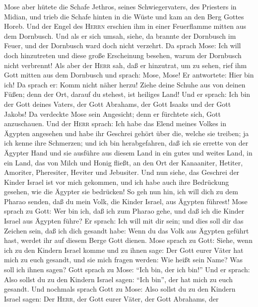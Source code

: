  Mose aber hütete die Schafe Jethros, seines
Schwiegervaters, des Priesters in Midian, und trieb die Schafe hinten in
die Wüste und kam an den Berg Gottes Horeb.  Und der Engel
des \textsc{Herrn} erschien ihm in einer Feuerflamme mitten aus dem
Dornbusch. Und als er sich umsah, siehe, da brannte der Dornbusch im
Feuer, und der Dornbusch ward doch nicht verzehrt.  Da
sprach Mose: Ich will doch hinzutreten und diese große Erscheinung
besehen, warum der Dornbusch nicht verbrennt!  Als aber
der \textsc{Herr} sah, daß er hinzutrat, um zu sehen, rief ihm Gott
mitten aus dem Dornbusch und sprach: Mose, Mose! Er antwortete: Hier bin
ich!  Da sprach er: Komm nicht näher herzu! Ziehe deine
Schuhe aus von deinen Füßen; denn der Ort, darauf du stehest, ist
heiliges Land!  Und er sprach: Ich bin der Gott deines
Vaters, der Gott Abrahams, der Gott Isaaks und der Gott Jakobs! Da
verdeckte Mose sein Angesicht; denn er fürchtete sich, Gott anzuschauen.
 Und der \textsc{Herr} sprach: Ich habe das Elend meines
Volkes in Ägypten angesehen und habe ihr Geschrei gehört über die,
welche sie treiben; ja ich kenne ihre Schmerzen;  und ich
bin herabgefahren, daß ich sie errette von der Ägypter Hand und sie
ausführe aus diesem Land in ein gutes und weites Land, in ein Land, das
von Milch und Honig fließt, an den Ort der Kanaaniter, Hetiter,
Amoriter, Pheresiter, Heviter und Jebusiter.  Und nun
siehe, das Geschrei der Kinder Israel ist vor mich gekommen, und ich
habe auch ihre Bedrückung gesehen, wie die Ägypter sie bedrücken!
 So geh nun hin, ich will dich zu dem Pharao senden, daß
du mein Volk, die Kinder Israel, aus Ägypten führest! 
Mose sprach zu Gott: Wer bin ich, daß ich zum Pharao gehe, und daß ich
die Kinder Israel aus Ägypten führe?  Er sprach: Ich will
mit dir sein; und dies soll dir das Zeichen sein, daß ich dich gesandt
habe: Wenn du das Volk aus Ägypten geführt hast, werdet ihr auf diesem
Berge Gott dienen.  Mose sprach zu Gott: Siehe, wenn ich
zu den Kindern Israel komme und zu ihnen sage: Der Gott eurer Väter hat
mich zu euch gesandt, und sie mich fragen werden: Wie heißt sein Name?
Was soll ich ihnen sagen?  Gott sprach zu Mose: ``Ich
bin, der ich bin!'' Und er sprach: Also sollst du zu den Kindern Israel
sagen: ``Ich bin'', der hat mich zu euch gesandt.  Und
nochmals sprach Gott zu Mose: Also sollst du zu den Kindern Israel
sagen: Der \textsc{Herr}, der Gott eurer Väter, der Gott Abrahams, der
